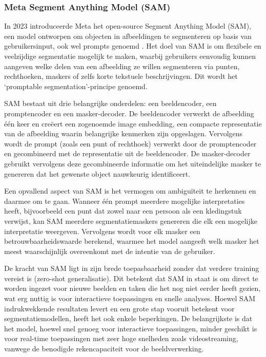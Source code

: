 \subsubsection{Meta Segment Anything Model (SAM)}

In 2023 introduceerde Meta het open-source Segment Anything Model (SAM), een model ontworpen om objecten in afbeeldingen te segmenteren op basis van gebruikersinput, ook wel prompts genoemd \autocite{Kirillov2023}. 
Het doel van SAM is om flexibele en veelzijdige segmentatie mogelijk te maken, waarbij gebruikers eenvoudig kunnen aangeven welke delen van een afbeelding ze willen segmenteren via punten, 
rechthoeken, maskers of zelfs korte tekstuele beschrijvingen. Dit wordt het `promptable segmentation'-principe genoemd.

SAM bestaat uit drie belangrijke onderdelen: een beeldencoder, een promptencoder en een masker-decoder. 
De beeldencoder verwerkt de afbeelding één keer en creëert een zogenoemde image embedding, een compacte representatie van de afbeelding waarin belangrijke kenmerken zijn opgeslagen. 
Vervolgens wordt de prompt (zoals een punt of rechthoek) verwerkt door de promptencoder en gecombineerd met de representatie uit de beeldencoder. 
De masker-decoder gebruikt vervolgens deze gecombineerde informatie om het uiteindelijke masker te genereren dat het gewenste object nauwkeurig identificeert.

Een opvallend aspect van SAM is het vermogen om ambiguïteit te herkennen en daarmee om te gaan. 
Wanneer één prompt meerdere mogelijke interpretaties heeft, bijvoorbeeld een punt dat zowel naar een persoon als een kledingstuk verwijst, kan SAM meerdere segmentatiemaskers genereren die elk een mogelijke interpretatie weergeven. 
Vervolgens wordt voor elk masker een betrouwbaarheidswaarde berekend, waarmee het model aangeeft welk masker het meest waarschijnlijk overeenkomt met de intentie van de gebruiker.

De kracht van SAM ligt in zijn brede toepasbaarheid zonder dat verdere training vereist is (zero-shot generalisatie). 
Dit betekent dat SAM in staat is om direct te worden ingezet voor nieuwe beelden en taken die het nog niet eerder heeft gezien, wat erg nuttig is voor interactieve toepassingen en snelle analyses.
Hoewel SAM indrukwekkende resultaten levert en een grote stap vooruit betekent voor segmentatiemodellen, heeft het ook enkele beperkingen. 
De belangrijkste is dat het model, hoewel snel genoeg voor interactieve toepassingen, minder geschikt is voor real-time toepassingen met zeer hoge snelheden zoals videostreaming, vanwege de benodigde rekencapaciteit voor de beeldverwerking.

